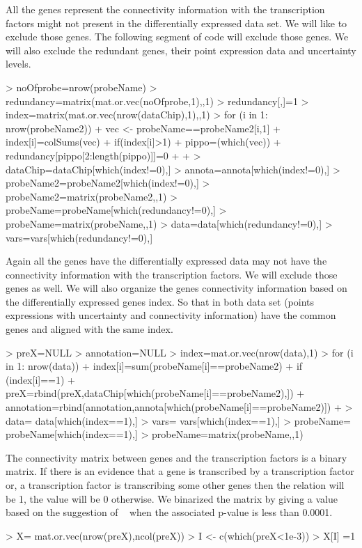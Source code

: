 \documentclass{article}
\begin{document}
All the genes represent the connectivity information with the transcription factors might not present in the differentially expressed data set. We will like to exclude those genes. The following segment of code will exclude those genes. We will also exclude the redundant genes, their point expression data and uncertainty levels.
\begin{Schunk}
\begin{Sinput}
> noOfprobe=nrow(probeName)
> redundancy=matrix(mat.or.vec(noOfprobe,1),,1)
> redundancy[,]=1
> index=matrix(mat.or.vec(nrow(dataChip),1),,1)
> for (i in 1: nrow(probeName2)){
+ 	vec <- probeName==probeName2[i,1]
+ 	index[i]=colSums(vec)
+ 	if(index[i]>1){
+ 		pippo=(which(vec))
+ 		redundancy[pippo[2:length(pippo)]]=0
+ 		}
+ 	}
> dataChip=dataChip[which(index!=0),]
> annota=annota[which(index!=0),]
> probeName2=probeName2[which(index!=0),]
> probeName2=matrix(probeName2,,1)
> probeName=probeName[which(redundancy!=0),]
> probeName=matrix(probeName,,1)
> data=data[which(redundancy!=0),]
> vars=vars[which(redundancy!=0),]
\end{Sinput}
\end{Schunk}

Again all the genes have the differentially expressed data may not have the connectivity information with the transcription factors. We will exclude those genes as well. We will also organize the genes connectivity information based on the differentially expressed genes index. So that in both data set (points expressions with uncertainty and connectivity information) have the common genes and aligned with the same index.

\begin{Schunk}
\begin{Sinput}
> preX=NULL
> annotation=NULL
> index=mat.or.vec(nrow(data),1)
> for (i in 1: nrow(data)){
+ 	index[i]=sum(probeName[i]==probeName2)
+ 	if (index[i]==1)		
+ 		preX=rbind(preX,dataChip[which(probeName[i]==probeName2),])
+ 		annotation=rbind(annotation,annota[which(probeName[i]==probeName2)])
+ }
> data= data[which(index==1),]
> vars= vars[which(index==1),]
> probeName= probeName[which(index==1),]
> probeName=matrix(probeName,,1)
\end{Sinput}
\end{Schunk}

The connectivity matrix between genes and the transcription factors is a binary matrix. If there is an evidence that a gene is transcribed by a transcription factor or, a transcription factor is transcribing some other genes then the relation will be 1, the value will be 0 otherwise. We binarized the matrix by giving a value based on the suggestion of ~\cite{lee:01} when the associated p-value is less than 0.0001.
\begin{Schunk}
\begin{Sinput}
> X= mat.or.vec(nrow(preX),ncol(preX))
> I <- c(which(preX<1e-3))
> X[I] =1
\end{Sinput}
\end{Schunk}
\end{document}
